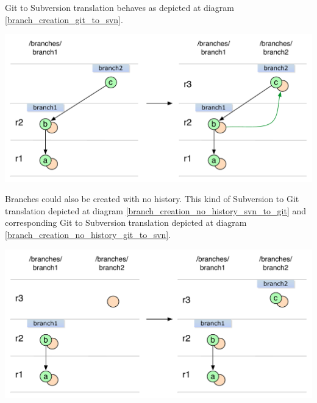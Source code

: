 Git to Subversion translation behaves as depicted at diagram \ref{branch_creation_git_to_svn}.
\begin{center}
\includegraphics[width=\textwidth]{img/diagrams/branch_creation_git_to_svn.pdf}%
\label{branch_creation_git_to_svn}%
\end{center}

Branches could also be created with no history. This kind of Subversion to Git translation depicted at diagram \ref{branch_creation_no_history_svn_to_git} and corresponding Git to Subversion translation depicted at diagram \ref{branch_creation_no_history_git_to_svn}.

\begin{center}
\includegraphics[width=\textwidth]{img/diagrams/branch_creation_no_history_svn_to_git.pdf}%
\label{branch_creation_no_history_svn_to_git}%
\end{center}

